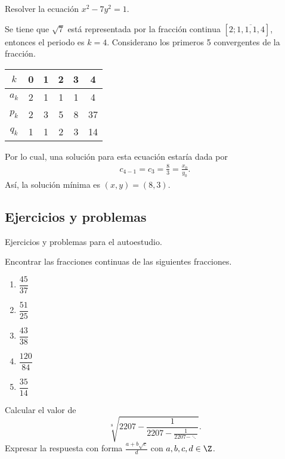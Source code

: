 \begin{example}
    Resolver la ecuación $x^2 - 7y^2 = 1$.
\end{example}
\begin{solution}
    Se tiene que $\sqrt {7}$ está representada por la fracción continua $[2;\overline{1,1,1,4}]$, entonces el periodo es $k = 4$.
    Considerano los primeros 5 convergentes de la fracción.
    \begin{table}[H]
        \centering
        \begin{tabular}{c||c|c|c|c|c}
            $k$ & 0 & 1 & 2 & 3 & 4 \\\hline\hline
            $a_k$ & 2 & 1 & 1 & 1 & 4\\
            $p_k$ & 2 & 3 & 5 & 8 & 37\\
            $q_k$ & 1 & 1 & 2 & 3 & 14\\
        \end{tabular}
    \end{table}
    Por lo cual, una solución para esta ecuación estaría dada por
    \begin{align*}
        c_{4 - 1} = c_3 = \frac{8}{3} = \frac{x_0}{y_0}.
    \end{align*}
    Así, la solución mínima es $(x,y) = (8,3)$.
\end{solution}


\subsection{Ejercicios y problemas}

Ejercicios y problemas para el autoestudio.

\begin{exercise}
    Encontrar las fracciones continuas de las siguientes fracciones.
    \begin{multicols}{3}
        \begin{enumerate}
            \item $\dfrac{45}{37}$
            \item $\dfrac{51}{25}$
            \item $\dfrac{43}{38}$
            \item $\dfrac{120}{84}$
            \item $\dfrac{35}{14}$
        \end{enumerate}
    \end{multicols}
\end{exercise}

\begin{problem}
    Calcular el valor de
    \[
        \sqrt[8]{2207 - \frac{1}{2207 - \frac{1}{2207 - \ddots}}}.
    \]
    Expresar la respuesta con forma $\frac{a + b\sqrt{c}}{d}$ con $a,b,c,d \in \Z$.
\end{problem}